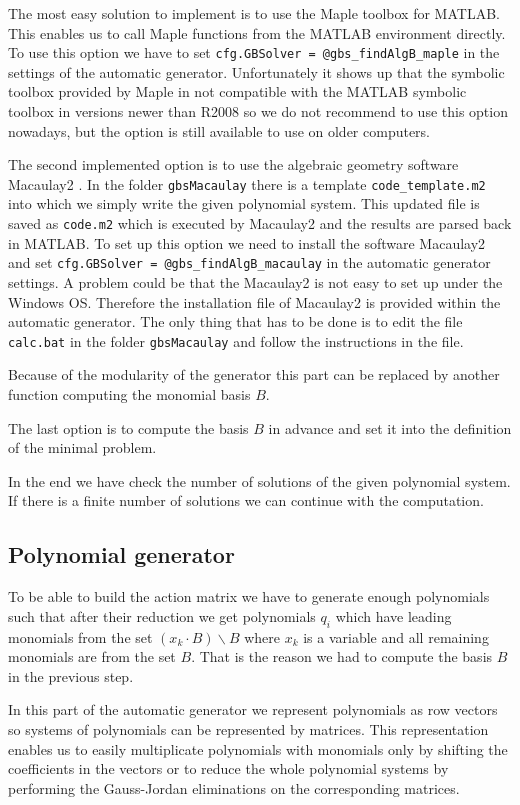 The most easy solution to implement is to use the Maple toolbox for MATLAB. This enables us to call Maple functions from the MATLAB environment directly. To use this option we have to set \texttt{cfg.GBSolver = @gbs\_findAlgB\_maple} in the settings of the automatic generator. Unfortunately it shows up that the symbolic toolbox provided by Maple in not compatible with the MATLAB symbolic toolbox in versions newer than R2008 so we do not recommend to use this option nowadays, but the option is still available to use on older computers.

The second implemented option is to use the algebraic geometry software Macaulay2 \cite{M2}. In the folder \texttt{gbsMacaulay} there is a template \texttt{code\_template.m2} into which we simply write the given polynomial system. This updated file is saved as \texttt{code.m2} which is executed by Macaulay2 and the results are parsed back in MATLAB. To set up this option we need to install the software Macaulay2 and set \texttt{cfg.GBSolver = @gbs\_findAlgB\_macaulay} in the automatic generator settings. A problem could be that the Macaulay2 is not easy to set up under the Windows OS. Therefore the installation file of Macaulay2 is provided within the automatic generator. The only thing that has to be done is to edit the file \texttt{calc.bat} in the folder \texttt{gbsMacaulay} and follow the instructions in the file.

Because of the modularity of the generator this part can be replaced by another function computing the monomial basis $B$.

The last option is to compute the basis $B$ in advance and set it into the definition of the minimal problem.

In the end we have check the number of solutions of the given polynomial system. If there is a finite number of solutions we can continue with the computation.

\subsection{Polynomial generator}
To be able to build the action matrix we have to generate enough polynomials such that after their reduction we get polynomials $q_i$ which have leading monomials from the set $\left(x_k \cdot B\right)\backslash B$ where $x_k$ is a variable and all remaining monomials are from the set $B$. That is the reason we had to compute the basis $B$ in the previous step.

In this part of the automatic generator we represent polynomials as row vectors so systems of polynomials can be represented by matrices. This representation enables us to easily multiplicate polynomials with monomials only by shifting the coefficients in the vectors or to reduce the whole polynomial systems by performing the Gauss-Jordan eliminations on the corresponding matrices.

